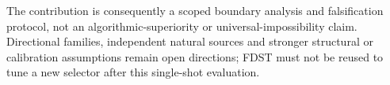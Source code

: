 \documentclass[10pt]{article}
\begin{document}
The contribution is consequently a scoped boundary analysis and falsification
protocol, not an algorithmic-superiority or universal-impossibility claim.
Directional families, independent natural sources and stronger structural or
calibration assumptions remain open directions; FDST must not be reused to
tune a new selector after this single-shot evaluation.



\end{document}
